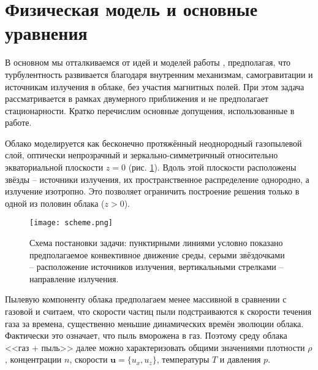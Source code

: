 \documentclass[a4paper,11pt,twoside]{article}
\begin{document}
\section{Физическая модель и основные уравнения}


В основном мы отталкиваемся от идей и моделей работы \cite{Zhukova2012}, предполагая, что турбулентность развивается благодаря внутренним механизмам, самогравитации и источникам излучения в облаке, без участия магнитных полей. При этом задача рассматривается в рамках двумерного приближения и не предполагает стационарности.
Кратко перечислим основные допущения, использованные в работе.

Облако моделируется как бесконечно протяжённый неоднородный газопылевой слой, оптически непрозрачный и зеркально-симметричный относительно экваториальной плоскости $z = 0$ (рис. \ref{pic_scheme}). Вдоль этой плоскости расположены звёзды -- источники излучения, их пространственное распределение однородно, а излучение изотропно. Это позволяет ограничить построение решения только в одной из половин облака ($z > 0$).

\begin{figure}[t]
\texttt{[image: scheme.png]}
\caption{Схема постановки задачи: пунктирными линиями условно показано предполагаемое конвективное движение среды, серыми звёздочками -- расположение источников излучения, вертикальными стрелками -- направление излучения.}
\label{pic_scheme}
\end{figure}

Пылевую компоненту облака предполагаем менее массивной в сравнении с газовой и считаем, что скорости частиц пыли подстраиваются к скорости течения газа за времена, существенно меньшие динамических времён эволюции облака.
Фактически это означает, что пыль вморожена в газ. Поэтому среду облака <<газ + пыль>> далее можно характеризовать общими значениями плотности $\rho$, концентрации $n$, скорости $\mathbf{u} = \{u_x, u_z\}$, температуры $T$ и давления $p$.
\end{document}
